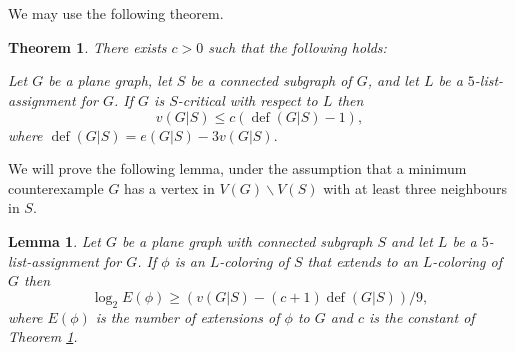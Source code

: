 \documentclass[letterpaper,12pt,oneside,onecolumn]{article}
\newtheorem{lemma}[fact]{Lemma}
\newtheorem{theorem}[fact]{Theorem}
\DeclareMathOperator{\defi}{def}
\begin{document}
\section{}
We may use the following theorem.
\begin{theorem}\label{th:def}
	There exists $c>0$ such that the following holds:
	
	Let $G$ be a plane graph, let $S$ be a connected subgraph of $G$, and let $L$ be a $5$-list-assignment for $G$. If $G$ is $S$-critical with respect to $L$ then
	$$v(G|S) \leq c(\defi(G|S) - 1),$$
	where $\defi(G|S) = e(G|S) - 3v(G|S).$
\end{theorem}
We will prove the following lemma, under the assumption that a minimum counterexample $G$ has a vertex in $V(G)\backslash V(S)$ with at least three neighbours in $S$.
\begin{lemma}
	Let $G$ be a plane graph with connected subgraph $S$ and let $L$ be a $5$-list-assignment for $G$. If $\phi$ is an $L$-coloring of $S$ that extends to an $L$-coloring of $G$ then
	$$\log_2 E(\phi) \geq (v(G|S) - (c+1)\defi(G|S))/9,$$
	where $E(\phi)$ is the number of extensions of $\phi$ to $G$ and $c$ is the constant of Theorem \ref{th:def}.
\end{lemma}
\end{document}
